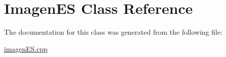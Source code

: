 \hypertarget{classImagenES}{}\section{Imagen\+ES Class Reference}
\label{classImagenES}


The documentation for this class was generated from the following file\+:\begin{DoxyCompactItemize}
\item 
\hyperlink{imagenES_8cpp}{imagen\+E\+S.\+cpp}\end{DoxyCompactItemize}
